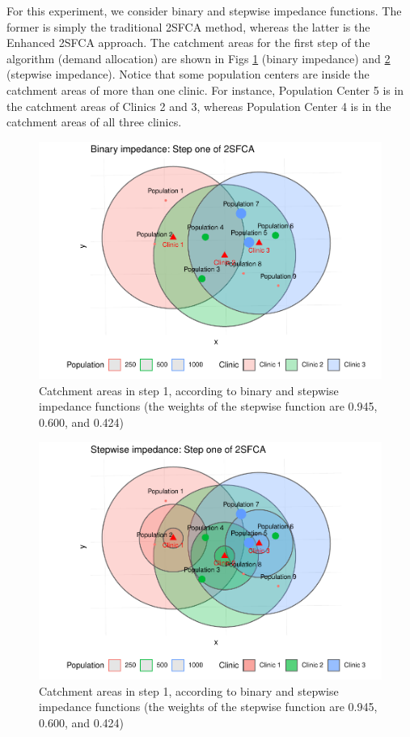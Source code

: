 \documentclass[10pt,letterpaper]{article}
\begin{document}
For this experiment, we consider binary and stepwise impedance
functions. The former is simply the traditional 2SFCA method, whereas
the latter is the Enhanced 2SFCA approach. The catchment areas for the
first step of the algorithm (demand allocation) are shown in Figs
\ref{fig:fig7-simulation-step1} (binary impedance) and
\ref{fig:fig8-simulation-step1} (stepwise impedance). Notice that some
population centers are inside the catchment areas of more than one
clinic. For instance, Population Center 5 is in the catchment areas of
Clinics 2 and 3, whereas Population Center 4 is in the catchment areas
of all three clinics.

\begin{figure}
\includegraphics[width=0.95\linewidth]{Supply_and_Demand_Inflation_in_FCA_Methods_v2.1_files/figure-latex/fig7-simulation-step1-1} \caption{\label{fig:fig7-simulation-step1}Catchment areas in step 1, according to binary and stepwise impedance functions (the weights of the stepwise function are 0.945, 0.600, and 0.424)}\label{fig:fig7-simulation-step1}
\end{figure}

\begin{figure}
\includegraphics[width=0.95\linewidth]{Supply_and_Demand_Inflation_in_FCA_Methods_v2.1_files/figure-latex/fig8-simulation-step1-1} \caption{\label{fig:fig8-simulation-step1}Catchment areas in step 1, according to binary and stepwise impedance functions (the weights of the stepwise function are 0.945, 0.600, and 0.424)}\label{fig:fig8-simulation-step1}
\end{figure}
\end{document}
